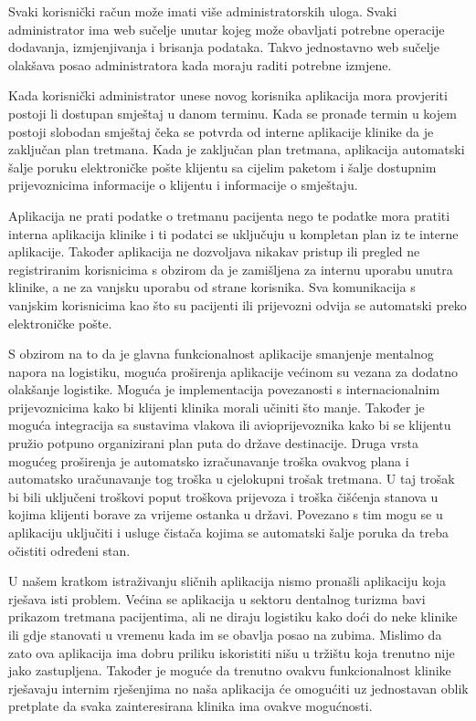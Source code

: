 		
		Svaki korisnički račun može imati više administratorskih uloga. Svaki administrator ima web sučelje unutar kojeg može obavljati potrebne operacije dodavanja, izmjenjivanja i brisanja podataka. Takvo jednostavno web sučelje olakšava posao administratora kada moraju raditi potrebne izmjene. 
		
		Kada korisnički administrator unese novog korisnika aplikacija mora provjeriti postoji li dostupan smještaj u danom terminu. Kada se pronađe termin u kojem postoji slobodan smještaj čeka se potvrda od interne aplikacije klinike da je zaključan plan tretmana. Kada je zaključan plan tretmana, aplikacija automatski šalje poruku elektroničke pošte klijentu sa cijelim paketom i šalje dostupnim prijevoznicima informacije o klijentu i informacije o smještaju.
		
		Aplikacija ne prati podatke o tretmanu pacijenta nego te podatke mora pratiti interna aplikacija klinike i ti podatci se uključuju u kompletan plan iz te interne aplikacije. Također aplikacija ne dozvoljava nikakav pristup ili pregled ne registriranim korisnicima s obzirom da je zamišljena za internu uporabu unutra klinike, a ne za vanjsku uporabu od strane korisnika. Sva komunikacija s vanjskim korisnicima kao što su pacijenti ili prijevozni odvija se automatski preko elektroničke pošte.
		
		S obzirom na to da je glavna funkcionalnost aplikacije smanjenje mentalnog napora na logistiku, moguća proširenja aplikacije većinom su vezana za dodatno olakšanje logistike. Moguća je implementacija povezanosti s internacionalnim prijevoznicima kako bi klijenti klinika morali učiniti što manje. Također je moguća integracija sa sustavima vlakova ili avioprijevoznika kako bi se klijentu pružio potpuno organizirani plan puta do države destinacije. Druga vrsta mogućeg proširenja je automatsko izračunavanje troška ovakvog plana i automatsko uračunavanje tog troška u cjelokupni trošak tretmana. U taj trošak bi bili uključeni troškovi poput troškova prijevoza i troška čišćenja stanova u kojima klijenti borave za vrijeme ostanka u državi. Povezano s tim mogu se u aplikaciju uključiti i usluge čistača kojima se automatski šalje poruka da treba očistiti određeni stan.
		
		\eject
		
		U našem kratkom istraživanju sličnih aplikacija nismo pronašli aplikaciju koja rješava isti problem. Većina se aplikacija u sektoru dentalnog turizma bavi prikazom tretmana pacijentima, ali ne diraju logistiku kako doći do neke klinike ili gdje stanovati u vremenu kada im se obavlja posao na zubima. Mislimo da zato ova aplikacija ima dobru priliku iskoristiti nišu u tržištu koja trenutno nije jako zastupljena. Također je moguće da trenutno ovakvu funkcionalnost klinike rješavaju internim rješenjima no naša aplikacija će omogućiti uz jednostavan oblik pretplate da svaka zainteresirana klinika ima ovakve mogućnosti.
	